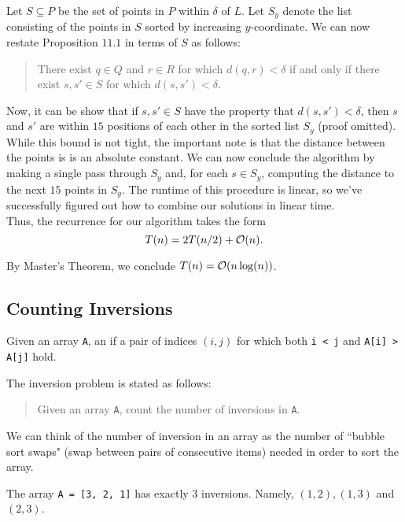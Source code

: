 Let $S \subseteq P$ be the set of points in $P$ within $\delta$ of $L$. Let $S_y$ denote the list consisting of the points in $S$ sorted by increasing $y$-coordinate. We can now restate Proposition $11.1$ in terms of $S$ as follows:

\begin{quote}
    There exist $q \in Q$ and $r\in R$ for which $d(q, r) < \delta$ if and only if there exist $s, s' \in S$ for which $d(s, s') < \delta$.  
\end{quote}
 
 
 Now, it can be show that if $s, s' \in S$ have the property that $d(s, s') < \delta$, then $s$ and $s'$ are within $15$ positions of each other in the sorted list $S_y$ (proof omitted). While this bound is not tight, the important note is that the distance between the points is is an absolute constant. We can now conclude the algorithm by making a single pass through $S_y$ and, for each $s\in S_y$, computing the distance to the next $15$ points in $S_y$. The runtime of this procedure is linear, so we've successfully figured out how to combine our solutions in linear time. \\
 
 Thus, the recurrence for our algorithm takes the form
 \[
 T(n) = 2T(n/2) + \mathcal{O}(n).
 \]
 
 By Master's Theorem, we conclude $T(n) = \mathcal{O}(n\log(n))$.

\subsection{Counting Inversions}

\begin{definition}
Given an array \verb!A!, an  if a pair of indices $(i, j)$ for which both \verb!i < j! and \verb!A[i] > A[j]! hold.  
\end{definition}




The inversion problem is stated as follows:

\begin{quote}
    Given an array \verb!A!, count the number of inversions in \verb!A!. 
\end{quote}

We can think of the number of inversion in an array as the number of ``bubble sort swaps" (swap between pairs of consecutive items) needed in order to sort the array. 

\begin{example}
The array \verb!A = [3, 2, 1]! has exactly $3$ inversions. Namely, $(1, 2), (1, 3)$ and $(2, 3)$. 
\end{example}

